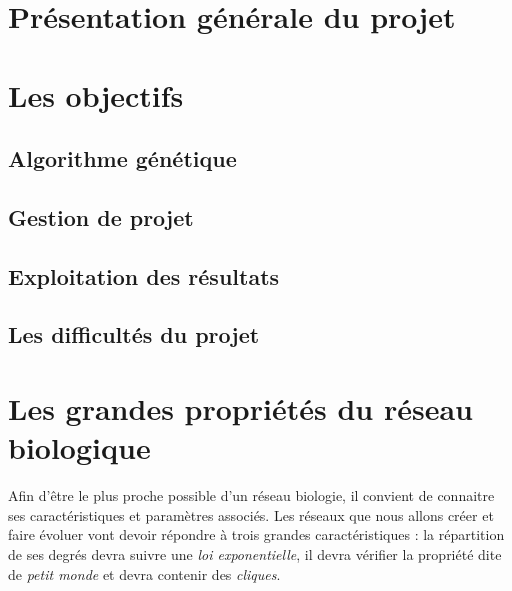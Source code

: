 


\maketitle

\section{Présentation générale du projet}


\section{Les objectifs}
\subsection*{Algorithme génétique}

\subsection*{Gestion de projet}

\subsection*{Exploitation des résultats}

\subsection*{Les difficultés du projet}


\section{Les grandes propriétés du réseau biologique}
Afin d'être le plus proche possible d'un réseau biologie, il convient de connaitre ses caractéristiques et paramètres associés. Les réseaux que nous allons créer et faire évoluer vont devoir répondre à trois grandes caractéristiques : la répartition de ses degrés devra suivre une \textit{loi exponentielle}, il devra vérifier la propriété dite de \textit{\og petit monde \fg} et devra contenir des \textit{cliques}.

